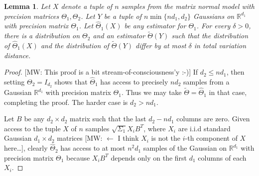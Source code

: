 \documentclass[aos]{imsart}
\newtheorem{lemma}[theorem]{Lemma}
\theoremstyle{definition}
\numberwithin{equation}{section}
\newcommand{\R}{{\mathbb{R}}}
\newcommand{\htheta}{\widehat{\Theta}}
\newcommand{\MW}[1]{{\color{red}[MW: #1]}}
\newcommand{\MW}[1]{{}}
\begin{document}
\begin{lemma}\label{lem:reduce-lower}
Let $X$ denote a tuple of $n$ samples from the matrix normal model with precision matrices $\Theta_1, \Theta_2$.
Let $Y$ be a tuple of $n\min\{nd_1, d_2\}$ Gaussians on $\R^{d_1}$ with precision matrix $\Theta_1$.
Let $\widehat{\Theta}_1(X)$ be any estimator for $\Theta_1$.
For every $\delta > 0$, there is a distribution on $\Theta_2$ and an estimator $\tilde{\Theta}(Y)$ such that the distribution of $\widehat{\Theta}_1(X)$ and the distribution of $\tilde{\Theta}(Y)$ differ by at most $\delta$ in total variation distance.
\end{lemma}
\begin{proof}
\MW{This proof is a bit stream-of-consciousness'y :-)}
If $d_2 \leq nd_1$, then setting $\Theta_2 = I_{d_2}$ shows that $\htheta_1$ has access to precisely $n d_2$ samples from a Gaussian $\R^{d_1}$ with precision matrix $\Theta_1$.
Thus we may take $\tilde{\Theta} = \htheta_1$ in that case, completing the proof. The harder case is $d_2 > n d_1$.

Let $B$ be any $d_2\times d_2$ matrix such that the last $d_2 - nd_1$ columns are zero.
Given access to the tuple $X$ of $n$ samples $\sqrt{\Sigma_1} X_i B^T$, where $X_i$ are i.i.d standard Gaussian $d_1\times d_2$ matrices \MW{$\leftarrow$ I think $X_i$ is not the $i$-th component of $X$ here\dots}, clearly $\widehat{\Theta}_2$ has access to at most $n^2 d_1$ samples of the Gaussian on $\R^{d_1}$ with precision matrix $\Theta_1$ because $X_i B^T$ depends only on the first $d_1$ columns of each $X_i$.


\end{proof}
\end{document}
